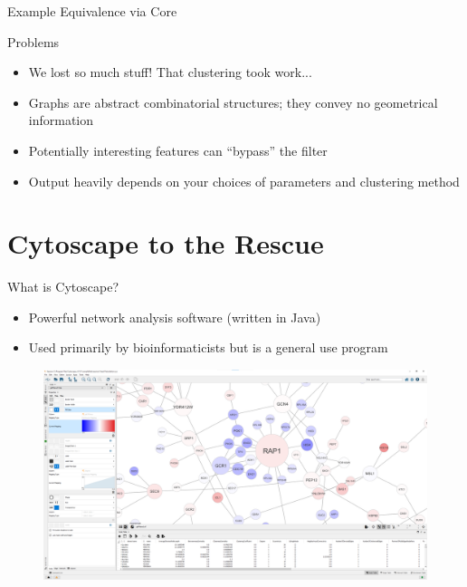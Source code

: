 \documentclass{beamer}
\begin{document}
\begin{frame}{Example Equivalence via Core}
\begin{figure}
\begin{center}
    \end{center}
  \end{figure}
\end{frame}

\begin{frame}{Problems}
  \begin{itemize}
    \item We lost so much stuff! That clustering took work...
    \item Graphs are abstract combinatorial structures; they convey no geometrical information
    \item Potentially interesting features can ``bypass'' the filter
    \item Output heavily depends on your choices of parameters and clustering method
  \end{itemize}
  
\end{frame}
\section{Cytoscape to the Rescue}
\begin{frame}{What is Cytoscape?}
  \begin{itemize}
    \item Powerful network analysis software (written in Java)
    \item Used primarily by bioinformaticists but is a general use program
  \end{itemize}
  \begin{figure}
    \begin{center}
      \includegraphics[width=1\textwidth]{cytoyeast.png}
    \end{center}
  \end{figure}
\end{frame}
\end{document}
